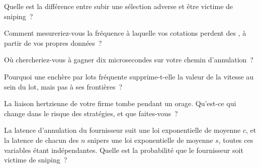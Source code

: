 \begin{interviewq}\label{iq:hf:latency-arbitrage-and-its-defence:1}
Quelle est la différence entre subir une sélection adverse et être victime de sniping~?
\end{interviewq}

\begin{interviewq}\label{iq:hf:latency-arbitrage-and-its-defence:2}
Comment mesureriez-vous la fréquence à laquelle vos cotations perdent des , à partir de vos propres données~?
\end{interviewq}

\begin{interviewq}\label{iq:hf:latency-arbitrage-and-its-defence:3}
Où chercheriez-vous à gagner dix microsecondes sur votre chemin d'annulation~?
\end{interviewq}

\begin{interviewq}\label{iq:hf:latency-arbitrage-and-its-defence:4}
Pourquoi une enchère par lots fréquente supprime-t-elle la valeur de la vitesse au sein du lot, mais pas à ses frontières~?
\end{interviewq}

\begin{interviewq}\label{iq:hf:latency-arbitrage-and-its-defence:5}
La liaison hertzienne de votre firme tombe pendant un orage. Qu'est-ce qui change dans le risque des stratégies, et que faites-vous~?
\end{interviewq}

\begin{interviewq}\label{iq:hf:latency-arbitrage-and-its-defence:6}
La latence d'annulation du fournisseur suit une loi exponentielle de moyenne $c$, et la latence de chacun des $n$ snipers une loi exponentielle de moyenne $s$, toutes ces variables étant indépendantes. Quelle est la
probabilité que le fournisseur soit victime de sniping~?
\end{interviewq}
